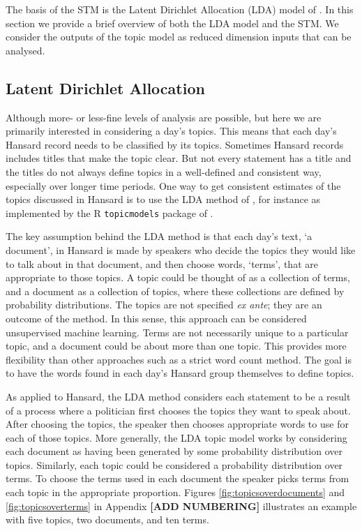 \documentclass[12pt,]{article}
\theoremstyle{definition}
\theoremstyle{definition}
\theoremstyle{definition}
\theoremstyle{remark}
\begin{document}
The basis of the STM is the Latent Dirichlet Allocation (LDA) model of
\citet{Blei2003latent}. In this section we provide a brief overview of
both the LDA model and the STM. We consider the outputs of the topic
model as reduced dimension inputs that can be analysed.

\subsection{Latent Dirichlet
Allocation}\label{latent-dirichlet-allocation}

Although more- or less-fine levels of analysis are possible, but here we
are primarily interested in considering a day's topics. This means that
each day's Hansard record needs to be classified by its topics.
Sometimes Hansard records includes titles that make the topic clear. But
not every statement has a title and the titles do not always define
topics in a well-defined and consistent way, especially over longer time
periods. One way to get consistent estimates of the topics discussed in
Hansard is to use the LDA method of \citet{Blei2003latent}, for instance
as implemented by the R \texttt{topicmodels} package of
\citet{Grun2011}.

The key assumption behind the LDA method is that each day's text, `a
document', in Hansard is made by speakers who decide the topics they
would like to talk about in that document, and then choose words,
`terms', that are appropriate to those topics. A topic could be thought
of as a collection of terms, and a document as a collection of topics,
where these collections are defined by probability distributions. The
topics are not specified \emph{ex ante}; they are an outcome of the
method. In this sense, this approach can be considered unsupervised
machine learning. Terms are not necessarily unique to a particular
topic, and a document could be about more than one topic. This provides
more flexibility than other approaches such as a strict word count
method. The goal is to have the words found in each day's Hansard group
themselves to define topics.

As applied to Hansard, the LDA method considers each statement to be a
result of a process where a politician first chooses the topics they
want to speak about. After choosing the topics, the speaker then chooses
appropriate words to use for each of those topics. More generally, the
LDA topic model works by considering each document as having been
generated by some probability distribution over topics. Similarly, each
topic could be considered a probability distribution over terms. To
choose the terms used in each document the speaker picks terms from each
topic in the appropriate proportion. Figures
\ref{fig:topicsoverdocuments} and \ref{fig:topicsoverterms} in Appendix
\textbf{{[}ADD NUMBERING{]}} illustrates an example with five topics,
two documents, and ten terms.
\end{document}

